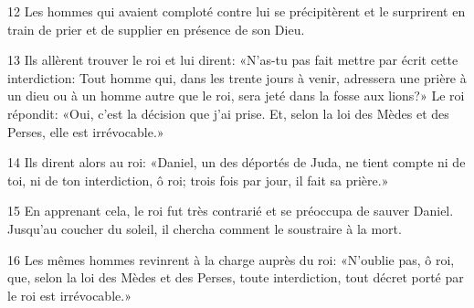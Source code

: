12 Les hommes qui avaient comploté contre lui se précipitèrent et le surprirent en train de prier et de supplier en présence de son Dieu.

13 Ils allèrent trouver le roi et lui dirent: «N’as-tu pas fait mettre par écrit cette interdiction: Tout homme qui, dans les trente jours à venir, adressera une prière à un dieu ou à un homme autre que le roi, sera jeté dans la fosse aux lions?» Le roi répondit: «Oui, c’est la décision que j’ai prise. Et, selon la loi des Mèdes et des Perses, elle est irrévocable.»

14 Ils dirent alors au roi: «Daniel, un des déportés de Juda, ne tient compte ni de toi, ni de ton interdiction, ô roi; trois fois par jour, il fait sa prière.»

15 En apprenant cela, le roi fut très contrarié et se préoccupa de sauver Daniel. Jusqu’au coucher du soleil, il chercha comment le soustraire à la mort.

16 Les mêmes hommes revinrent à la charge auprès du roi: «N’oublie pas, ô roi, que, selon la loi des Mèdes et des Perses, toute interdiction, tout décret porté par le roi est irrévocable.»
